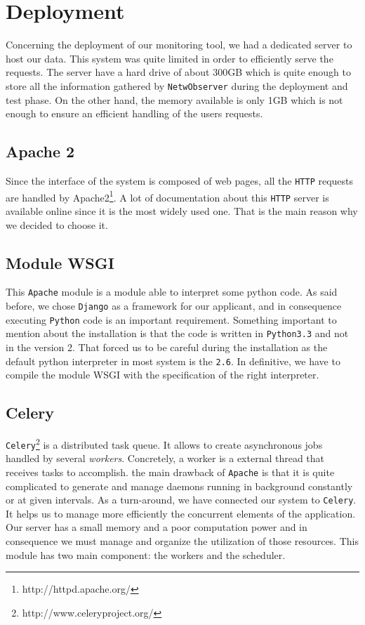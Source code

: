\section{Deployment}
Concerning the deployment of our monitoring tool, we had a dedicated server to host our data. This system was quite limited in order to efficiently serve the requests. The server have a hard drive of about 300GB which is quite enough to store all the information gathered by \texttt{NetwObserver} during the deployment and test phase. On the other hand, the memory available is only 1GB which is not enough to ensure an efficient handling of the users requests.

\subsection{Apache 2}
Since the interface of the system is composed of web pages, all the \texttt{HTTP} requests are handled by Apache2\footnote{http://httpd.apache.org/}. A lot of documentation about this \texttt{HTTP} server is available online since it is the most widely used one. That is the main reason why we decided to choose it.

\subsection{Module WSGI}
This \texttt{Apache} module is a module able to interpret some python code. As said before, we chose \texttt{Django} as a framework for our applicant, and in consequence executing \texttt{Python} code is an important requirement. Something important to mention about the installation is that the code is written in \texttt{Python3.3} and not in the version 2. That forced us to be careful during the installation as the default python interpreter in most system is the \texttt{2.6}. In definitive, we have to compile the module WSGI with the specification of the right interpreter.

\subsection{Celery}
\texttt{Celery}\footnote{http://www.celeryproject.org/} is a distributed task queue. It allows to create asynchronous jobs handled by several \emph{workers}. Concretely, a worker is a external thread that receives tasks to accomplish. the main drawback of \texttt{Apache} is that it is quite complicated to generate and manage daemons running in background constantly or at given intervals. As a turn-around, we have connected our system to \texttt{Celery}. It helps us to manage more efficiently the concurrent elements of the application. Our server has a small memory and a poor computation power and in consequence we must manage and organize the utilization of those resources. This module has two main component: the workers and the scheduler.

